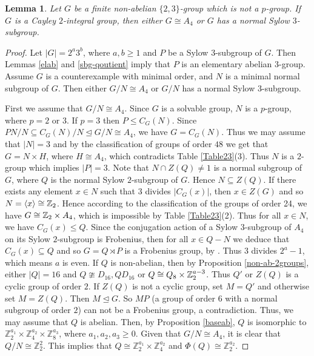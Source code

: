\documentclass{amsart}
\newtheorem{lem}[thm]{Lemma}
\def \leq {\leqslant}
\def \geq {\geqslant}
\begin{document}
\begin{lem}\label{akhlaghi1}
	Let $G$ be a finite non-abelian  $\{2,3\}$-group which is not a $p$-group. If $G$ is a Cayley $2$-integral group, then either $G\cong A_4$ or $G$ has a normal Sylow $3$-subgroup.
\end{lem}
\begin{proof}
Let $|G|=2^a 3^b$, where $a,b\geq 1$ and $P$ be a Sylow $3$-subgroup of $G$. Then Lemmas \ref{elab} and \ref{sbg-qoutient} imply that $P$ is an elementary abelian $3$-group.	Assume $G$ is a counterexample with minimal order, and $N$ is a minimal normal subgroup of $G$. Then either $G/N\cong A_4$ or $G/N$ has a normal Sylow $3$-subgroup. 
	
	First we assume that $G/N\cong A_4$. Since $G$ is a solvable group, $N$ is a $p$-group, where $p=2$ or $3$. If $p=3$ then $P\leq C_G(N)$. Since $PN/N\subseteq C_G(N)/N\unlhd G/N\cong A_4$, we have $G=C_G(N)$. Thus we may assume that $|N|=3$ and by the classification of groups of order $48$ we get that $G=N\times H$, where $H\cong A_4$,  which contradicts Table \ref{Table23}(3). Thus $N$ is a $2$-group which implies $|P|=3$. 
	Note that $N\cap Z(Q)\not =1	$ is a normal subgroup of $G$, where $Q$ is the normal Sylow $2$-subgroup of $G$. Hence $N\subseteq Z(Q)$.  If there exists any element $x\in N$ such that $3$ divides $|C_G(x)|$, then $x\in Z(G)$ and so $N=\langle x\rangle\cong\Bbb Z_2$. Hence according to the classification of the groups of order 24, we have  $G\cong\Bbb Z_2\times A_4$, which is impossible by Table \ref{Table23}(2). Thus for all $x\in N$, we have $C_G(x)\leq Q$.  Since the conjugation action of a Sylow $3$-subgroup of $A_4$ on its Sylow $2$-subgroup is Frobenius, then  for all $x\in Q-N$  we deduce that  	
	$C_G(x)\subseteq Q$ and so  $G=Q\rtimes P$ is a Frobenius group, by \cite[Theorem 6.4]{Issacs}. Thus $3$ divides $2^a-1$, which means $a$ is even. If $Q$ is non-abelian, then by Proposition \ref{non-ab-2groups}, either $|Q|=16$ and $Q\ncong D_{16}, QD_{16}$ or $Q\cong Q_8\times\Bbb Z_2^{a-3}$. Thus $Q'$ or $Z(Q)$ is a cyclic group of order $2$. If $Z(Q)$ is not a cyclic group, set $M=Q'$ and otherwise set $M=Z(Q)$. Then $M\unlhd G$. So $MP$ (a group of order $6$ with a normal subgroup of order $2$) can not be a Frobenius group, a contradiction. Thus, we may assume that \( Q \) is abelian. Then, by Proposition \ref{baseab}, \( Q \) is isomorphic to \( \mathbb{Z}_2^{a_1} \times \mathbb{Z}_4^{a_2} \times \mathbb{Z}_8^{a_3} \), where \( a_1, a_2, a_3 \geq 0 \). Given that \( G/N \cong A_4 \), it is clear that \( Q/N \cong \mathbb{Z}_2^2 \). This implies that \( Q \cong \mathbb{Z}_2^{a_1} \times \mathbb{Z}_4^{a_2} \) and \( \Phi(Q) \cong \mathbb{Z}_2^{a_2} \). 
	

\end{proof}
\end{document}

